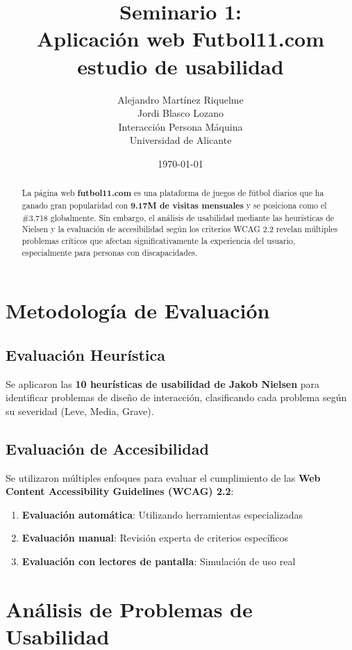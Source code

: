\documentclass{article}
\title{Seminario 1: \\ Aplicación web Futbol11.com estudio de usabilidad }
\author{
	Alejandro Martínez Riquelme \\
	Jordi Blasco Lozano \\
	\small Interacción Persona Máquina \\
	\small Universidad de Alicante
}
\date{\today}
\begin{document}
	
	\maketitle

	\begin{abstract}
	\noindent 
	La página web \textbf{futbol11.com} es una plataforma de juegos de fútbol diarios que ha ganado gran popularidad con \textbf{9.17M de visitas mensuales} y se posiciona como el \#3,718 globalmente. Sin embargo, el análisis de usabilidad mediante las heurísticas de Nielsen y la evaluación de accesibilidad según los criterios WCAG 2.2 revelan múltiples problemas críticos que afectan significativamente la experiencia del usuario, especialmente para personas con discapacidades.
	\end{abstract}

	\newpage
	\tableofcontents
	\newpage

	\section{Metodología de Evaluación}
	
	\subsection{Evaluación Heurística}
	\noindent
	Se aplicaron las \textbf{10 heurísticas de usabilidad de Jakob Nielsen} para identificar problemas de diseño de interacción, clasificando cada problema según su severidad (Leve, Media, Grave).

	\subsection{Evaluación de Accesibilidad}
	\noindent
	Se utilizaron múltiples enfoques para evaluar el cumplimiento de las \textbf{Web Content Accessibility Guidelines (WCAG) 2.2}:
	\begin{enumerate}
		\item \textbf{Evaluación automática}: Utilizando herramientas especializadas
		\item \textbf{Evaluación manual}: Revisión experta de criterios específicos
		\item \textbf{Evaluación con lectores de pantalla}: Simulación de uso real
	\end{enumerate}

	\section{Análisis de Problemas de Usabilidad}
\end{document}
